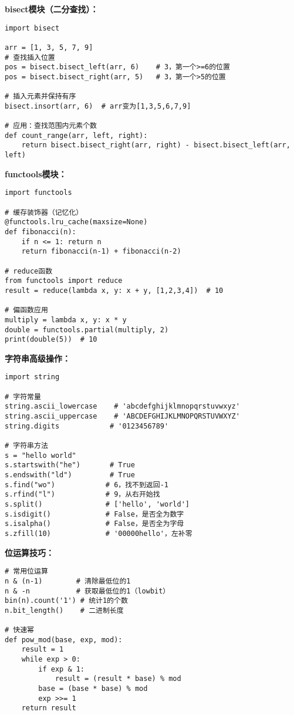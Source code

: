 \documentclass[a4paper,9pt,twocolumn]{ctexart}
\begin{document}
\textbf{bisect模块（二分查找）：}
\begin{verbatim}
import bisect

arr = [1, 3, 5, 7, 9]
# 查找插入位置
pos = bisect.bisect_left(arr, 6)    # 3，第一个>=6的位置
pos = bisect.bisect_right(arr, 5)   # 3，第一个>5的位置

# 插入元素并保持有序
bisect.insort(arr, 6)  # arr变为[1,3,5,6,7,9]

# 应用：查找范围内元素个数
def count_range(arr, left, right):
    return bisect.bisect_right(arr, right) - bisect.bisect_left(arr, left)
\end{verbatim}

\textbf{functools模块：}
\begin{verbatim}
import functools

# 缓存装饰器（记忆化）
@functools.lru_cache(maxsize=None)
def fibonacci(n):
    if n <= 1: return n
    return fibonacci(n-1) + fibonacci(n-2)

# reduce函数
from functools import reduce
result = reduce(lambda x, y: x + y, [1,2,3,4])  # 10

# 偏函数应用
multiply = lambda x, y: x * y
double = functools.partial(multiply, 2)
print(double(5))  # 10
\end{verbatim}

\textbf{字符串高级操作：}
\begin{verbatim}
import string

# 字符常量
string.ascii_lowercase    # 'abcdefghijklmnopqrstuvwxyz'
string.ascii_uppercase    # 'ABCDEFGHIJKLMNOPQRSTUVWXYZ'
string.digits            # '0123456789'

# 字符串方法
s = "hello world"
s.startswith("he")       # True
s.endswith("ld")         # True
s.find("wo")            # 6，找不到返回-1
s.rfind("l")            # 9，从右开始找
s.split()               # ['hello', 'world']
s.isdigit()             # False，是否全为数字
s.isalpha()             # False，是否全为字母
s.zfill(10)             # '00000hello'，左补零
\end{verbatim}

\textbf{位运算技巧：}
\begin{verbatim}
# 常用位运算
n & (n-1)        # 清除最低位的1
n & -n           # 获取最低位的1（lowbit）
bin(n).count('1') # 统计1的个数
n.bit_length()    # 二进制长度

# 快速幂
def pow_mod(base, exp, mod):
    result = 1
    while exp > 0:
        if exp & 1:
            result = (result * base) % mod
        base = (base * base) % mod
        exp >>= 1
    return result
\end{verbatim}
\end{document}

